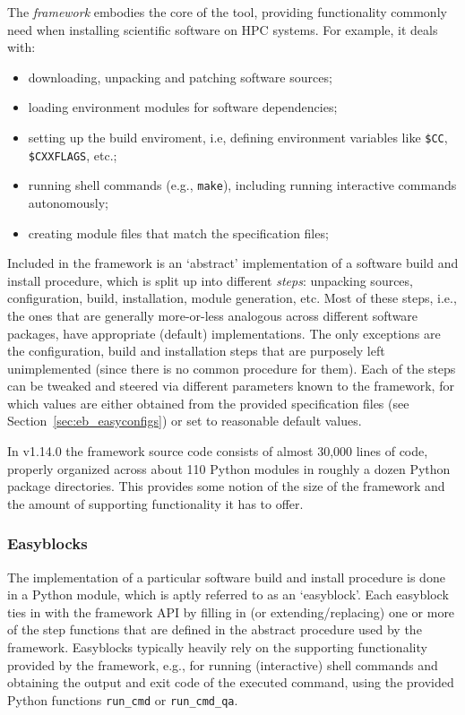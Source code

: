The \easybuild{} \emph{framework} embodies the core of the tool,
providing functionality commonly need when installing scientific software on HPC
systems. For example, it deals with:
\begin{itemize}
    \item downloading, unpacking and patching software sources;
    \item loading environment modules for software dependencies;
    \item setting up the build enviroment, i.e, defining environment variables
    like \texttt{\$CC},
    \texttt{\$CXXFLAGS}, etc.;
    \item running shell commands (e.g., \texttt{make}), including running
    interactive commands autonomously;
    \item creating module files that match the specification files;
\end{itemize}

Included in the framework is an `abstract' implementation of a software build and
install procedure, which is split up into different \emph{steps}: unpacking sources,
configuration, build, installation, module generation, etc. Most of these steps, i.e.,
the ones that are generally more-or-less analogous across
different software packages, have appropriate (default) implementations. The only
exceptions are the configuration, build and installation steps that are purposely
left unimplemented (since there is no common procedure for them). Each of the steps
can be tweaked and steered via different parameters known to the framework, for
which values are either obtained from the provided specification files (see
Section~\ref{sec:eb_easyconfigs}) or set to reasonable default values.

In \easybuild{} v1.14.0 the framework source code consists of almost 30,000 lines
of code, properly organized across about 110 Python modules in roughly a dozen Python
package directories. This provides some notion of the size of the \easybuild{}
framework and the amount of supporting functionality it has to offer.

\subsubsection{Easyblocks}
\label{sec:eb_easyblocks}

The implementation of a particular software build and install procedure is done in
a Python module, which is aptly referred to as an `easyblock'. Each easyblock
ties in with the framework API by filling in (or extending/replacing) one or more of
the step functions that are defined in the abstract procedure used by the \easybuild{}
framework. Easyblocks typically heavily rely on the supporting functionality provided
by the framework, e.g., for running (interactive) shell commands and obtaining the output and exit code of the executed command, using the provided Python functions
\texttt{run\_cmd} or \texttt{run\_cmd\_qa}.

